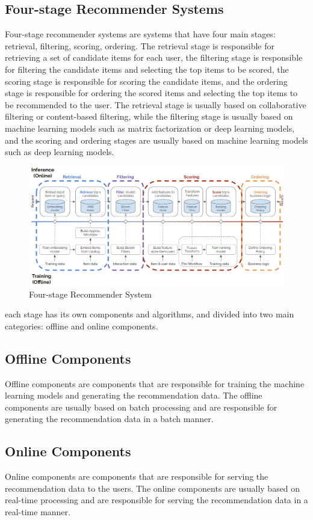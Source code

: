 \subsection*{Four-stage Recommender Systems}
Four-stage recommender systems are systems that have four main stages: retrieval, filtering, scoring, ordering. The retrieval stage is responsible for retrieving a set of candidate items for each user, the filtering stage is responsible for filtering the candidate items and selecting the top items to be scored, the scoring stage is responsible for scoring the candidate items, and the ordering stage is responsible for ordering the scored items and selecting the top items to be recommended to the user. The retrieval stage is usually based on collaborative filtering or content-based filtering, while the filtering stage is usually based on machine learning models such as matrix factorization or deep learning models, and the scoring and ordering stages are usually based on machine learning models such as deep learning models.\cite{NvidiaRecSysBestPractices}
\begin{figure}[H]
    \centering
    \includegraphics[width=1\textwidth]{assets/Four_stage_rec_sys.png}
    \caption{Four-stage Recommender System\cite{NvidiaRecSysBestPractices}}
\end{figure}
each stage has its own components and algorithms, and divided into two main categories: offline and online components.
\subsection*{Offline Components}
Offline components are components that are responsible for training the machine learning models and generating the recommendation data. The offline components are usually based on batch processing and are responsible for generating the recommendation data in a batch manner.\cite{NvidiaOfflineToOnline}
\subsection*{Online Components}
Online components are components that are responsible for serving the recommendation data to the users. The online components are usually based on real-time processing and are responsible for serving the recommendation data in a real-time manner.\cite{NvidiaOfflineToOnline}